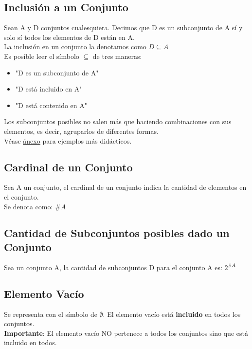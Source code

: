 \documentclass[10pt,a4paper]{article}
\begin{document}
\subsection*{Inclusión a un Conjunto}
Sean A y D conjuntos cualesquiera.
Decimos que D es un subconjunto de A sí y solo sí todos los elementos de D están en A. \\
La inclusión en un conjunto la denotamos como $D \subseteq A$ \\
Es posible leer el símbolo $ \subseteq $ de tres maneras: 
\begin{itemize}
    \item "D es un subconjunto de A"
    \item "D está incluido en A"
    \item "D está contenido en A"
\end{itemize}
Los subconjuntos posibles no salen más que haciendo combinaciones con sus elementos, es decir, agruparlos de diferentes formas. \\
Véase \hyperref[subsec:inclusion_conjuntos]{\underline{ánexo}} para ejemplos más didácticos.
\subsection*{Cardinal de un Conjunto}
Sea A un conjunto, el cardinal de un conjunto indica la cantidad de elementos en el conjunto. \\
Se denota como: $\#A$
\subsection*{Cantidad de Subconjuntos posibles dado un Conjunto}
Sea un conjunto A, la cantidad de subconjuntos D para el conjunto A es: $2^{\#A}$
\subsection*{Elemento Vacío}
Se representa con el símbolo de $\emptyset$. El elemento vacío está \textbf{incluido} en todos los conjuntos. \\
\textbf{Importante}: El elemento vacío NO pertenece a todos los conjuntos sino que está incluido en todos.
\end{document}
